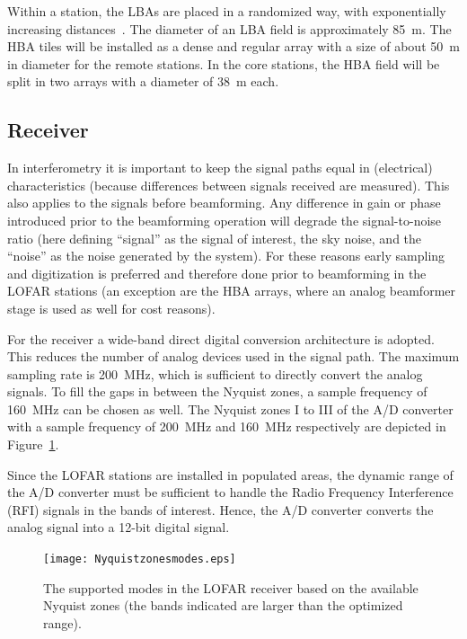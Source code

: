 \documentclass[journal]{IEEEtran}
\begin{document}
Within a station, the LBAs are placed in a randomized way, with exponentially
increasing distances~\cite{capp:06}.
The diameter of an LBA field is approximately 85~m.
The HBA tiles will be installed as a dense and regular array with a size of
about 50~m in diameter for the remote stations.
In the core stations, the HBA field will be split in two arrays with a diameter
of 38~m each. 

\subsection{Receiver}

In interferometry it is important to keep the signal paths equal in
(electrical) characteristics (because differences between signals received
are measured).
This also applies to the signals before beamforming.
Any difference in gain or phase introduced prior to the beamforming operation
will degrade the signal-to-noise ratio (here defining ``signal'' as the signal
of interest, the sky noise, and the ``noise'' as the noise generated by the
system).
For these reasons early sampling and digitization is preferred and therefore
done prior to beamforming in the LOFAR stations (an exception are the HBA
arrays, where an analog beamformer stage is used as well for cost reasons). 

For the receiver a wide-band direct digital conversion architecture is adopted.
This reduces the number of analog devices used in the signal path.
The maximum sampling rate is 200~MHz, which is sufficient to directly convert
the analog signals.
To fill the gaps in between the Nyquist zones, a sample frequency of 160~MHz
can be chosen as well.
The Nyquist zones I to III of the A/D converter with a sample frequency of
200~MHz and 160~MHz respectively are depicted in Figure~\ref{fig:nyquistzones}. 

Since the LOFAR stations are installed in populated areas, the dynamic range
of the A/D converter must be sufficient to handle the Radio Frequency
Interference (RFI) signals in the bands of interest.
Hence, the A/D converter converts the analog signal into a 12-bit digital
signal. 

\begin{figure}
\begin{center}
\texttt{[image: Nyquistzonesmodes.eps]}
\end{center}
\caption{The supported modes in the LOFAR receiver based on the available Nyquist zones (the bands indicated are larger than the optimized range).}
\label{fig:nyquistzones}
\end{figure}
\end{document}

